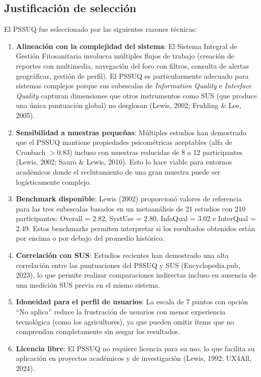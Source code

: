 \documentclass[a4paper,12pt]{report}
\begin{document}
\subsection{Justificación de selección}

El PSSUQ fue seleccionado por las siguientes razones técnicas:

\begin{enumerate}
    \item \textbf{Alineación con la complejidad del sistema}: El Sistema Integral de Gestión Fitosanitaria involucra múltiples flujos de trabajo (creación de reportes con multimedia, navegación del foro con filtros, consulta de alertas geográficas, gestión de perfil). El PSSUQ es particularmente adecuado para sistemas complejos porque sus subescalas de \textit{Information Quality} e \textit{Interface Quality} capturan dimensiones que otros instrumentos como SUS (que produce una única puntuación global) no desglosan (Lewis, 2002; Fruhling \& Lee, 2005).

    \item \textbf{Sensibilidad a muestras pequeñas}: Múltiples estudios han demostrado que el PSSUQ mantiene propiedades psicométricas aceptables (alfa de Cronbach $> 0.83$) incluso con muestras reducidas de 8 a 12 participantes (Lewis, 2002; Sauro \& Lewis, 2016). Esto lo hace viable para entornos académicos donde el reclutamiento de una gran muestra puede ser logísticamente complejo.

    \item \textbf{Benchmark disponible}: Lewis (2002) proporcionó valores de referencia para las tres subescalas basados en un metaanálisis de 21 estudios con 210 participantes: Overall = 2.82, SystUse = 2.80, InfoQual = 3.02 e InterQual = 2.49. Estos benchmarks permiten interpretar si los resultados obtenidos están por encima o por debajo del promedio histórico.

    \item \textbf{Correlación con SUS}: Estudios recientes han demostrado una alta correlación entre las puntuaciones del PSSUQ y SUS (Encyclopedia.pub, 2023), lo que permite realizar comparaciones indirectas incluso en ausencia de una medición SUS previa en el mismo sistema.

    \item \textbf{Idoneidad para el perfil de usuarios}: La escala de 7 puntos con opción ``No aplica'' reduce la frustración de usuarios con menor experiencia tecnológica (como los agricultores), ya que pueden omitir ítems que no comprendan completamente sin sesgar los resultados.

    \item \textbf{Licencia libre}: El PSSUQ no requiere licencia para su uso, lo que facilita su aplicación en proyectos académicos y de investigación (Lewis, 1992; UX4All, 2024).
\end{enumerate}
\end{document}
